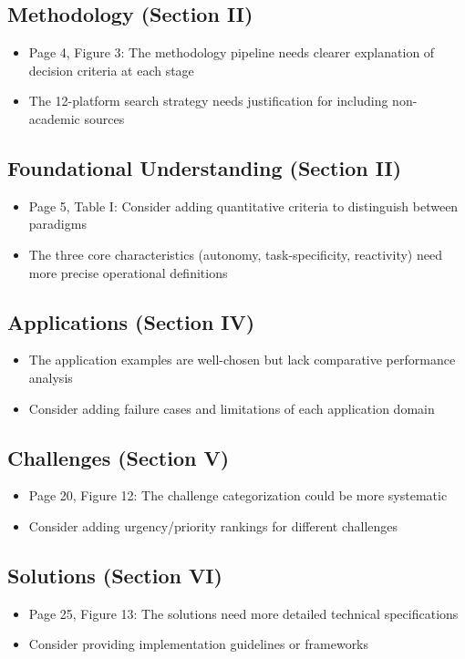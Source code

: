 \documentclass[12pt]{article}
\begin{document}
{\subsection{Methodology (Section II)}
\begin{itemize}
\item Page 4, Figure 3: The methodology pipeline needs clearer explanation of decision criteria at each stage
\item The 12-platform search strategy needs justification for including non-academic sources
\end{itemize}

\subsection{Foundational Understanding (Section II)}
\begin{itemize}
\item Page 5, Table I: Consider adding quantitative criteria to distinguish between paradigms
\item The three core characteristics (autonomy, task-specificity, reactivity) need more precise operational definitions
\end{itemize}

\subsection{Applications (Section IV)}
\begin{itemize}
\item The application examples are well-chosen but lack comparative performance analysis
\item Consider adding failure cases and limitations of each application domain
\end{itemize}

\subsection{Challenges (Section V)}
\begin{itemize}
\item Page 20, Figure 12: The challenge categorization could be more systematic
\item Consider adding urgency/priority rankings for different challenges
\end{itemize}

\subsection{Solutions (Section VI)}
\begin{itemize}
\item Page 25, Figure 13: The solutions need more detailed technical specifications
\item Consider providing implementation guidelines or frameworks
\end{itemize}

}
\end{document}
